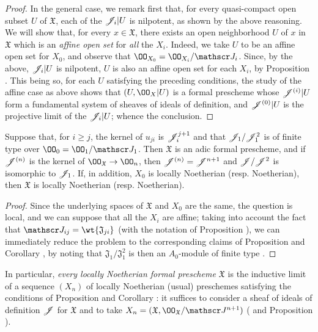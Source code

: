 \begin{proof}
In the general case, we remark first that, for every quasi-compact open subset $U$ of $\mathfrak{X}$, each of the $\mathscr{J}_i|U$ is nilpotent, as shown by the above reasoning.
We will show that, for every $x\in\mathfrak{X}$, there exists an open neighborhood $U$ of $x$ in $\mathfrak{X}$ which is an \emph{affine open set} for \emph{all} the $X_i$.
Indeed, we take $U$ to be an affine open set for $X_0$, and observe that $\OO_{X_0}=\OO_{X_i}/\sh{J}_i$.
Since, by the above, $\mathscr{J}_i|U$ is nilpotent, $U$ is also an affine open set for each $X_i$, by Proposition .
This being so, for each $U$ satisfying the preceding conditions, the study of the affine case as above shows that $(U,\OO_X|U)$ is a formal prescheme whose $\mathscr{J}^{(i)}|U$ form a fundamental system of sheaves of ideals of definition, and $\mathscr{J}^{(0)}|U$ is the projective limit of the $\mathscr{J}_i|U$; whence the conclusion.
\end{proof}

\begin{cor}[10.6.4]
\label{1.10.6.4}
Suppose that, for $i\geq j$, the kernel of $u_{ji}$ is $\mathscr{J}_i^{j+1}$ and that $\mathscr{J}_1/\mathscr{J}_1^2$
is of finite type over $\OO_0=\OO_1/\sh{J}_1$.
Then $\mathfrak{X}$ is an adic formal prescheme, and if $\mathscr{J}^{(n)}$ is the kernel of $\OO_\mathfrak{X}\to\OO_n$, then $\mathscr{J}^{(n)}=\mathscr{J}^{n+1}$ and $\mathscr{J}/\mathscr{J}^2$ is isomorphic to $\mathscr{J}_1$.
If, in addition, $X_0$ is locally Noetherian (resp. Noetherian), then $\mathfrak{X}$ is locally Noetherian (resp. Noetherian).
\end{cor}

\begin{proof}
\label{proof-1.10.6.4}
Since the underlying spaces of $\mathfrak{X}$ and $X_0$ are the same, the question is local, and we can suppose that all the $X_i$ are affine; taking into account the fact that $\sh{J}_{ij}=\wt{\mathfrak{J}_{ji}}$ (with the notation of Proposition ), we can immediately reduce the problem to the corresponding claims of Proposition  and Corollary , by noting that $\mathfrak{J}_1/\mathfrak{J}_1^2$ is then an $A_0$-module of finite type .
\end{proof}

In particular, \emph{every locally Noetherian formal prescheme $\mathfrak{X}$} is the inductive limit of a sequence $(X_n)$ of locally Noetherian (usual) preschemes satisfying the conditions of Proposition  and Corollary : it suffices to consider a sheaf of ideals of definition $\mathscr{J}$ for $\mathfrak{X}$  and to take $X_n=(\mathfrak{X},\OO_\mathfrak{X}/\sh{J}^{n+1})$ ( and Proposition ).


